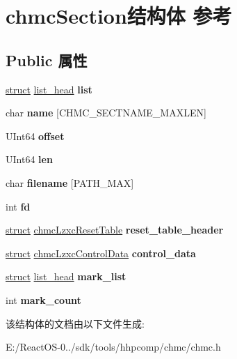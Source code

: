 \hypertarget{structchmc_section}{}\section{chmc\+Section结构体 参考}
\label{structchmc_section}
\subsection*{Public 属性}
\begin{DoxyCompactItemize}
\item 
\mbox{\label{structchmc_section_ad2605e4f3a7bb1c1f61ef1f030313d8b}} 
\hyperlink{interfacestruct}{struct} \hyperlink{structlist__head}{list\+\_\+head} {\bfseries list}
\item 
\mbox{\label{structchmc_section_a230cffe3853e72d0917c541b5b087518}} 
char {\bfseries name} \mbox{[}C\+H\+M\+C\+\_\+\+S\+E\+C\+T\+N\+A\+M\+E\+\_\+\+M\+A\+X\+L\+EN\mbox{]}
\item 
\mbox{\label{structchmc_section_af423052c9b51015d61f07802fa062abf}} 
U\+Int64 {\bfseries offset}
\item 
\mbox{\label{structchmc_section_ac95dcf15493fb5f6049b0368cc38a545}} 
U\+Int64 {\bfseries len}
\item 
\mbox{\label{structchmc_section_ac2e468d70f4a127eba7160e1d170006c}} 
char {\bfseries filename} \mbox{[}P\+A\+T\+H\+\_\+\+M\+AX\mbox{]}
\item 
\mbox{\label{structchmc_section_a741ee10b1e14c2f1c5f65e5be15fa7a9}} 
int {\bfseries fd}
\item 
\mbox{\label{structchmc_section_a06be01e7c90569125c3370ccee4a1400}} 
\hyperlink{interfacestruct}{struct} \hyperlink{structchmc_lzxc_reset_table}{chmc\+Lzxc\+Reset\+Table} {\bfseries reset\+\_\+table\+\_\+header}
\item 
\mbox{\label{structchmc_section_a1e2830316d76d2b233bca45cbb0073e5}} 
\hyperlink{interfacestruct}{struct} \hyperlink{structchmc_lzxc_control_data}{chmc\+Lzxc\+Control\+Data} {\bfseries control\+\_\+data}
\item 
\mbox{\label{structchmc_section_ab95ef13c65f36b8cdd269da97b0141c3}} 
\hyperlink{interfacestruct}{struct} \hyperlink{structlist__head}{list\+\_\+head} {\bfseries mark\+\_\+list}
\item 
\mbox{\label{structchmc_section_a3b03654ca177acb2a455f06820f7bc51}} 
int {\bfseries mark\+\_\+count}
\end{DoxyCompactItemize}


该结构体的文档由以下文件生成\+:\begin{DoxyCompactItemize}
\item 
E\+:/\+React\+O\+S-\/0../sdk/tools/hhpcomp/chmc/chmc.\+h\end{DoxyCompactItemize}
